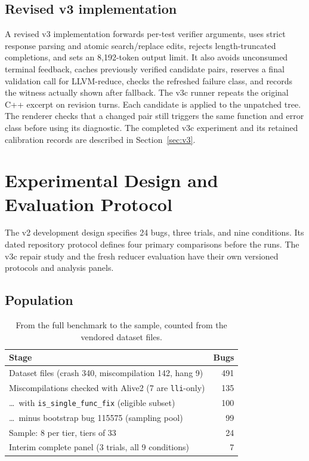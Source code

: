 \documentclass[conference]{IEEEtran}
\begin{document}
\subsection{Revised v3 implementation}

A revised v3 implementation forwards per-test verifier arguments, uses strict response parsing and atomic search/replace edits, rejects length-truncated completions, and sets an 8{,}192-token output limit. It also avoids unconsumed terminal feedback, caches previously verified candidate pairs, reserves a final validation call for LLVM-reduce, checks the refreshed failure class, and records the witness actually shown after fallback. The v3c runner repeats the original C++ excerpt on revision turns. Each candidate is applied to the unpatched tree. The renderer checks that a changed pair still triggers the same function and error class before using its diagnostic. The completed v3c experiment and its retained calibration records are described in Section~\ref{sec:v3}.

\section{Experimental Design and Evaluation Protocol}
\label{sec:design}

The v2 development design specifies 24 bugs, three trials, and nine conditions. Its dated repository protocol defines four primary comparisons before the runs. The v3c repair study and the fresh reducer evaluation have their own versioned protocols and analysis panels.

\subsection{Population}

\begin{table}[t]
\caption{From the full benchmark to the sample, counted from the vendored dataset files.}
\label{tab:funnel}
\centering\footnotesize
\begin{tabular}{@{}p{}r@{}}
\toprule
Stage & Bugs \\
\midrule
Dataset files (crash 340, miscompilation 142, hang 9) & 491 \\
Miscompilations checked with Alive2 (7 are \texttt{lli}-only) & 135 \\
\ldots\ with \texttt{is\_single\_func\_fix} (eligible subset) & 100 \\
\ldots\ minus bootstrap bug 115575 (sampling pool) & 99 \\
Sample: 8 per tier, tiers of 33 & 24 \\
Interim complete panel (3 trials, all 9 conditions) & 7 \\
\bottomrule
\end{tabular}
\end{table}
\end{document}
